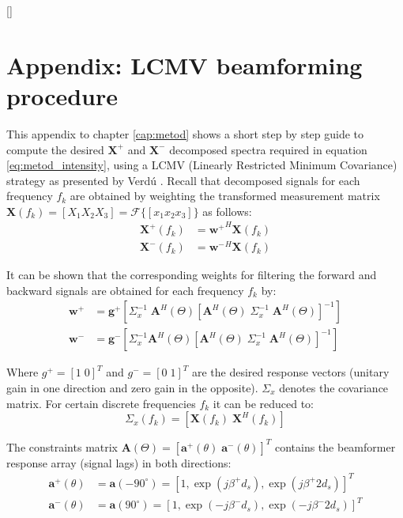 \newpage
\begin{subappendices}
\begingroup
{}[\vspace{-1mm}]
\section{Appendix: LCMV beamforming procedure}
\endgroup
\label{ann:beamformer}

This appendix to chapter \ref{cap:metod} shows a short step by step guide to compute the desired $\mathbf X^+$ and $\mathbf X^-$ decomposed spectra required in equation \ref{eq:metod_intensity}, using a LCMV (Linearly Restricted Minimum Covariance) strategy as presented by Verdú \cite{verdu2003contribucion}. Recall that decomposed signals for each frequency $f_k$ are obtained by weighting the transformed measurement matrix $\mathbf X(f_k)=[X_1 X_2 X_3]=\mathcal F\{[x_1 x_2 x_3]\}$ as follows:
\begin{align}
    \mathbf X^+(f_k)&=\mathbf {w^+}^H\mathbf X(f_k)\\\nonumber
    \mathbf X^-(f_k)&=\mathbf {w^-}^H\mathbf X(f_k)
\end{align}

It can be shown that the corresponding weights for filtering the forward and backward signals are obtained for each frequency $f_k$ by:
\begin{align}
    \mathbf w^+ &=\mathbf g^+\left[ \Sigma^{-1}_x\; \mathbf A^H(\Theta)\left[\mathbf A^H(\Theta)\; \Sigma^{-1}_x\; \mathbf A^H(\Theta)\right]^{-1}\right]\\\nonumber
    \mathbf w^- &=\mathbf g^-\left[ \Sigma^{-1}_x \mathbf A^H(\Theta)\left[\mathbf A^H(\Theta)\; \Sigma^{-1}_x\; \mathbf A^H(\Theta)\right]^{-1}\right]
\end{align}

Where $g^+=[1\;0]^T$ and $g^-=[0\;1]^T$ are the desired response vectors (unitary gain in one direction and zero gain in the opposite). $\Sigma_x$ denotes the covariance matrix. For certain discrete frequencies $f_k$ it can be reduced to:
\begin{equation}
  \Sigma_x(f_k)=[\mathbf X(f_k)\;\mathbf X^H(f_k)]
\end{equation}

The constraints matrix $\mathbf A(\Theta)=[\mathbf a^+(\theta)\; \mathbf a^-(\theta)]^T$ contains the beamformer response array (signal lags) in both directions:
\begin{align}
    \mathbf a^+(\theta) &= \mathbf a(-90^\circ)=\left[1,\exp(j\beta^+d_s),\exp(j\beta^+2d_s)\right]^T\\\nonumber
    \mathbf a^-(\theta) &= \mathbf a(90^\circ)=\left[1,\exp(-j\beta^-d_s),\exp(-j\beta^-2d_s)\right]^T
\end{align}


\end{subappendices}
